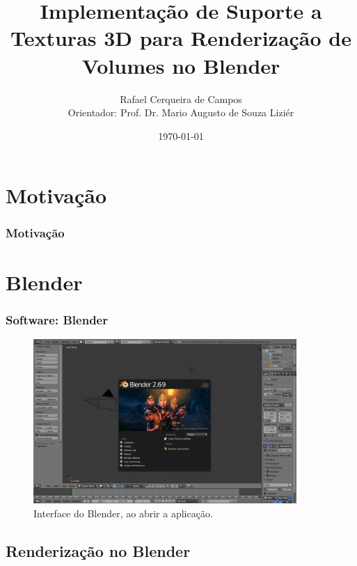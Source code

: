 \documentclass{beamer}
\title[Defesa]{Implementação de Suporte a Texturas 3D para Renderização de
Volumes no Blender}
\author[Rafael Campos]{Rafael Cerqueira de Campos \\ Orientador: Prof. Dr. Mario Augusto de Souza Liziér}
\institute[DC - UFSCAR]{Graduação em Engenharia de Computação - UFSCar}
\date{\today}
\begin{document}
\frame{\titlepage}

\AtBeginSubsection[]

\begin{frame}[allowframebreaks]
\tableofcontents
\end{frame}

\section{Motivação}

\begin{frame}

\frametitle{Motivação}


\end{frame}

\section{Blender}

\begin{frame}

\frametitle{Software: Blender}

\begin{figure}[!htb]
\center
\includegraphics[width=10cm]{blender_gui}
\caption{Interface do Blender, ao abrir a aplicação.}
\label{blender_gui}
\end{figure}


\end{frame}
\subsection{Renderização no Blender}
\end{document}
